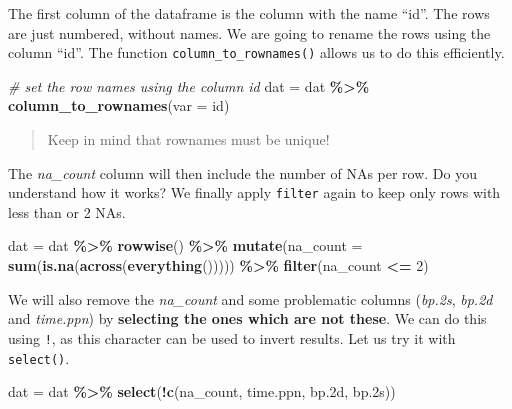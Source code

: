 \documentclass[
]{book}
\newenvironment{Shaded}{\begin{snugshade}}{\end{snugshade}}
\newcommand{\AttributeTok}[1]{\textcolor[rgb]{0.13,0.29,0.53}{#1}}
\newcommand{\CommentTok}[1]{\textcolor[rgb]{0.56,0.35,0.01}{\textit{#1}}}
\newcommand{\DecValTok}[1]{\textcolor[rgb]{0.00,0.00,0.81}{#1}}
\newcommand{\FloatTok}[1]{\textcolor[rgb]{0.00,0.00,0.81}{#1}}
\newcommand{\FunctionTok}[1]{\textcolor[rgb]{0.13,0.29,0.53}{\textbf{#1}}}
\newcommand{\NormalTok}[1]{#1}
\newcommand{\OtherTok}[1]{\textcolor[rgb]{0.56,0.35,0.01}{#1}}
\newcommand{\SpecialCharTok}[1]{\textcolor[rgb]{0.81,0.36,0.00}{\textbf{#1}}}
\newcommand{\StringTok}[1]{\textcolor[rgb]{0.31,0.60,0.02}{#1}}
\begin{document}
The first column of the dataframe is the column with the name ``id''.
The rows are just numbered, without names.
We are going to rename the rows using the column ``id''. The function \texttt{column\_to\_rownames()} allows us to do this efficiently.

\begin{Shaded}
\begin{Highlighting}[]
\CommentTok{\# set the row names using the column id}
\NormalTok{dat }\OtherTok{=}\NormalTok{ dat }\SpecialCharTok{\%\textgreater{}\%}
  \FunctionTok{column\_to\_rownames}\NormalTok{(}\AttributeTok{var =} \StringTok{\textquotesingle{}id\textquotesingle{}}\NormalTok{)}
\end{Highlighting}
\end{Shaded}

\begin{quote}
Keep in mind that rownames must be unique!
\end{quote}

The \emph{na\_count} column will then include the number of NAs per row. Do you understand how it works?
We finally apply \texttt{filter} again to keep only rows with less than or 2 NAs.

\begin{Shaded}
\begin{Highlighting}[]
\NormalTok{dat }\OtherTok{=}\NormalTok{ dat }\SpecialCharTok{\%\textgreater{}\%}
  \FunctionTok{rowwise}\NormalTok{() }\SpecialCharTok{\%\textgreater{}\%}
  \FunctionTok{mutate}\NormalTok{(}\AttributeTok{na\_count =} \FunctionTok{sum}\NormalTok{(}\FunctionTok{is.na}\NormalTok{(}\FunctionTok{across}\NormalTok{(}\FunctionTok{everything}\NormalTok{())))) }\SpecialCharTok{\%\textgreater{}\%}
  \FunctionTok{filter}\NormalTok{(na\_count }\SpecialCharTok{\textless{}=} \DecValTok{2}\NormalTok{)}
\end{Highlighting}
\end{Shaded}

We will also remove the \emph{na\_count} and some problematic columns (\emph{bp.2s}, \emph{bp.2d} and \emph{time.ppn}) by \textbf{selecting the ones which are not these}. We can do this using \texttt{!}, as this character can be used to invert results. Let us try it with \texttt{select()}.

\begin{Shaded}
\begin{Highlighting}[]
\NormalTok{dat }\OtherTok{=}\NormalTok{ dat }\SpecialCharTok{\%\textgreater{}\%}
  \FunctionTok{select}\NormalTok{(}\SpecialCharTok{!}\FunctionTok{c}\NormalTok{(na\_count, time.ppn, bp}\FloatTok{.2}\NormalTok{d, bp}\FloatTok{.2}\NormalTok{s))}
\end{Highlighting}
\end{Shaded}
\end{document}
